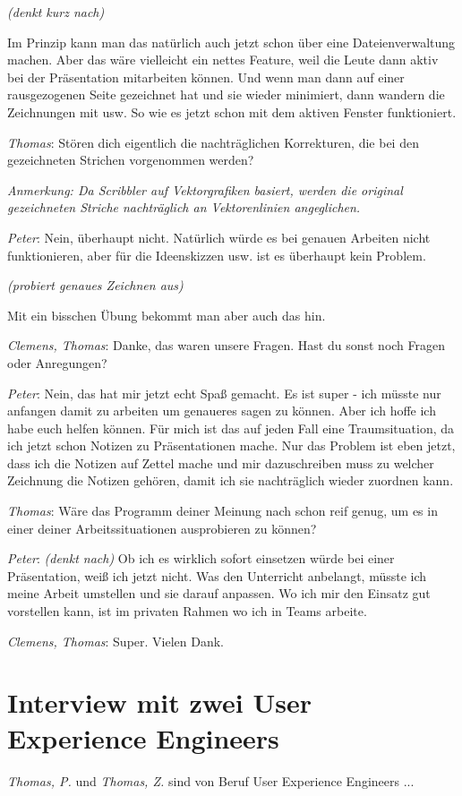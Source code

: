 \smallskip \emph{(denkt kurz nach)} 

\smallskip Im Prinzip kann man das natürlich auch jetzt schon über eine Dateienverwaltung machen. Aber das wäre vielleicht ein nettes Feature, weil die Leute dann aktiv bei der Präsentation mitarbeiten können. Und wenn man dann auf einer rausgezogenen Seite gezeichnet hat und sie wieder minimiert, dann wandern die Zeichnungen mit usw. So wie es jetzt schon mit dem aktiven Fenster funktioniert.

\medskip \emph{Thomas}: Stören dich eigentlich die nachträglichen Korrekturen, die bei den gezeichneten Strichen vorgenommen werden?

\smallskip \emph{Anmerkung: Da Scribbler auf Vektorgrafiken basiert, werden die original gezeichneten Striche nachträglich an Vektorenlinien angeglichen.}

\medskip \emph{Peter}: Nein, überhaupt nicht. Natürlich würde es bei genauen Arbeiten nicht funktionieren, aber für die Ideenskizzen usw. ist es überhaupt kein Problem. 

\smallskip \emph{(probiert genaues Zeichnen aus)}

\smallskip Mit ein bisschen Übung bekommt man aber auch das hin.

\medskip \emph{Clemens, Thomas}: Danke, das waren unsere Fragen. Hast du sonst noch Fragen oder Anregungen?

\medskip \emph{Peter}: Nein, das hat mir jetzt echt Spaß gemacht. Es ist super - ich müsste nur anfangen damit zu arbeiten um genaueres sagen zu können. Aber ich hoffe ich habe euch helfen können. Für mich ist das auf jeden Fall eine Traumsituation, da ich jetzt schon Notizen zu Präsentationen mache. Nur das Problem ist eben jetzt, dass ich die Notizen auf Zettel mache und mir dazuschreiben muss zu welcher Zeichnung die Notizen gehören, damit ich sie nachträglich wieder zuordnen kann.

\medskip \emph{Thomas}: Wäre das Programm deiner Meinung nach schon reif genug, um es in einer deiner Arbeitssituationen ausprobieren zu können?

\medskip \emph{Peter}: \emph{(denkt nach)}
Ob ich es wirklich sofort einsetzen würde bei einer Präsentation, weiß ich jetzt nicht. Was den Unterricht anbelangt, müsste ich meine Arbeit umstellen und sie darauf anpassen. Wo ich mir den Einsatz gut vorstellen kann, ist im privaten Rahmen wo ich in Teams arbeite.

\medskip \emph{Clemens, Thomas}: Super. Vielen Dank.

\clearpage
\section{Interview mit zwei User Experience Engineers}
\emph{Thomas, P.} und \emph{Thomas, Z.} sind von Beruf User Experience Engineers ... 